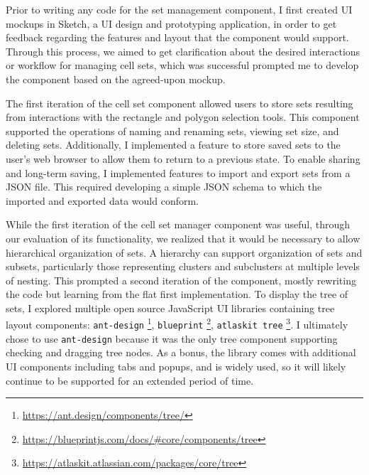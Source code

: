 \documentclass[12pt, letterpaper]{article}
\begin{document}
Prior to writing any code for the set management component, I first created UI mockups in Sketch, a UI design and prototyping application, in order to get feedback regarding the features and layout that the component would support.
Through this process, we aimed to get clarification about the desired interactions or workflow for managing cell sets, which was successful prompted me to develop the component based on the agreed-upon mockup.

The first iteration of the cell set component allowed users to store sets resulting from interactions with the rectangle and polygon selection tools.
This component supported the operations of naming and renaming sets, viewing set size, and deleting sets.
Additionally, I implemented a feature to store saved sets to the user's web browser to allow them to return to a previous state.
To enable sharing and long-term saving, I implemented features to import and export sets from a JSON file.
This required developing a simple JSON schema to which the imported and exported data would conform.

While the first iteration of the cell set manager component was useful, through our evaluation of its functionality, we realized that it would be necessary to allow hierarchical organization of sets.
A hierarchy can support organization of sets and subsets, particularly those representing clusters and subclusters at multiple levels of nesting.
This prompted a second iteration of the component, mostly rewriting the code but learning from the flat first implementation.
To display the tree of sets, I explored multiple open source JavaScript UI libraries containing tree layout components: \texttt{ant-design} \footnote{\url{https://ant.design/components/tree/}}, \texttt{blueprint} \footnote{\url{https://blueprintjs.com/docs/\#core/components/tree}}, \texttt{atlaskit tree} \footnote{\url{https://atlaskit.atlassian.com/packages/core/tree}}.
I ultimately chose to use \texttt{ant-design} because it was the only tree component supporting checking and dragging tree nodes.
As a bonus, the library comes with additional UI components including tabs and popups, and is widely used, so it will likely continue to be supported for an extended period of time.
\end{document}
